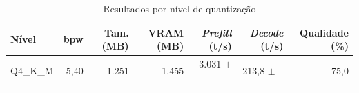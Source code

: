 \begin{table}[htb]
\centering
\caption{Resultados por nível de quantização}
\label{tab:resultados}
\begin{tabular}{lrrrrrr}
\hline
\textbf{Nível} & \textbf{bpw} & \textbf{Tam. (MB)} & \textbf{VRAM (MB)} & \textbf{\textit{Prefill} (t/s)} & \textbf{\textit{Decode} (t/s)} & \textbf{Qualidade (\%)} \\
\hline
Q4\_K\_M & 5,40 & 1.251 & 1.455 & 3.031 $\pm$ -- & 213,8 $\pm$ -- & 75,0 \\
\hline
\end{tabular}
\end{table}
